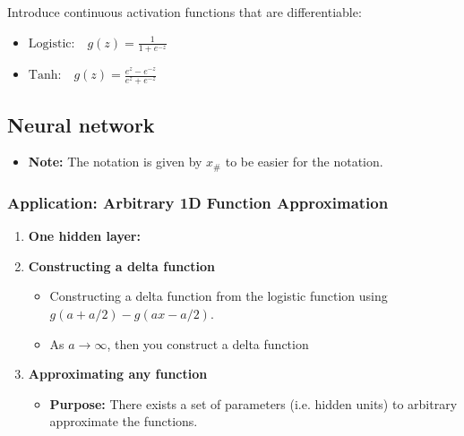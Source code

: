 \begin{definition}
    Introduce continuous activation functions that are differentiable: 
    \begin{itemize}
        \item $\text{Logistic:} \quad g(z) = \frac{1}{1 + e^{-z}}$
        \item $\text{Tanh:} \quad g(z) = \frac{e^z - e^{-z}}{e^z + e^{-z}}$
    \end{itemize}
\end{definition}

\subsection{Neural network}
\begin{example}
    \begin{itemize}
        \item \textbf{Note:} The notation is given by $x_\#$ to be easier for the notation.
    \end{itemize}
\end{example}

\subsubsection{Application: Arbitrary 1D Function Approximation}
\begin{example}
    \begin{enumerate}
        \item \textbf{One hidden layer:}
        \item \textbf{Constructing a delta function}
        \begin{itemize}
            \item Constructing a delta function from the logistic function using $g(a+a/2)-g(ax-a/2)$.
            \item As $a\rightarrow \infty$, then you construct a delta function 
        \end{itemize}

        \item \textbf{Approximating any function}
        \begin{itemize}
            \item \textbf{Purpose:} There exists a set of parameters (i.e. hidden units) to arbitrary approximate the functions.
        \end{itemize}
    \end{enumerate}
\end{example}

